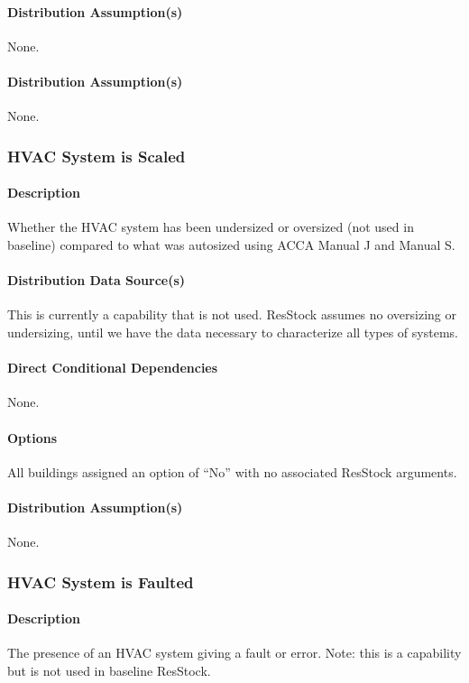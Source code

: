 \paragraph{Distribution Assumption(s)}
None.


\paragraph{Distribution Assumption(s)}
None.


\subsubsection{HVAC System is Scaled}

\paragraph{Description}
Whether the HVAC system has been undersized or oversized (not used in baseline) compared to what was autosized using ACCA Manual J and Manual S.
\paragraph{Distribution Data Source(s)}
This is currently a capability that is not used. ResStock assumes no oversizing or undersizing, until we have the data necessary to characterize all types of systems.
\paragraph{Direct Conditional Dependencies}
None.
\paragraph{Options}
All buildings assigned an option of ``No'' with no associated ResStock arguments.
\paragraph{Distribution Assumption(s)}
None.

\subsubsection{HVAC System is Faulted}
\paragraph{Description}
The presence of an HVAC system giving a fault or error. Note: this is a capability but is not used in baseline ResStock.

